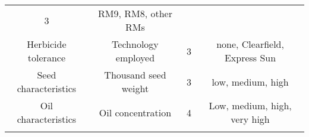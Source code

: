 \documentclass[a4paper]{article}
\begin{document}
\begin{longtable}[]{@{}cccc@{}}
\begin{minipage}[t]{0.09\columnwidth}
3\strut
\end{minipage} & \begin{minipage}[t]{0.29\columnwidth}\centering\strut
RM9, RM8, other RMs\strut
\end{minipage}\tabularnewline
\begin{minipage}[t]{0.24\columnwidth}\centering\strut
Herbicide tolerance\strut
\end{minipage} & \begin{minipage}[t]{0.28\columnwidth}\centering\strut
Technology employed\strut
\end{minipage} & \begin{minipage}[t]{0.09\columnwidth}\centering\strut
3\strut
\end{minipage} & \begin{minipage}[t]{0.29\columnwidth}\centering\strut
none, Clearfield, Express Sun\strut
\end{minipage}\tabularnewline
\begin{minipage}[t]{0.24\columnwidth}\centering\strut
Seed characteristics\strut
\end{minipage} & \begin{minipage}[t]{0.28\columnwidth}\centering\strut
Thousand seed weight\strut
\end{minipage} & \begin{minipage}[t]{0.09\columnwidth}\centering\strut
3\strut
\end{minipage} & \begin{minipage}[t]{0.29\columnwidth}\centering\strut
low, medium, high\strut
\end{minipage}\tabularnewline
\begin{minipage}[t]{0.24\columnwidth}\centering\strut
Oil characteristics\strut
\end{minipage} & \begin{minipage}[t]{0.28\columnwidth}\centering\strut
Oil concentration\strut
\end{minipage} & \begin{minipage}[t]{0.09\columnwidth}\centering\strut
4\strut
\end{minipage} & \begin{minipage}[t]{0.29\columnwidth}\centering\strut
Low, medium, high, very high\strut
\end{minipage}\tabularnewline
\begin{minipage}[t]{0.24\columnwidth}\centering\strut
\strut
\end{minipage} & \begin{minipage}[t]{0.28\columnwidth}\centering\strut

\end{minipage}
\end{longtable}
\end{document}
